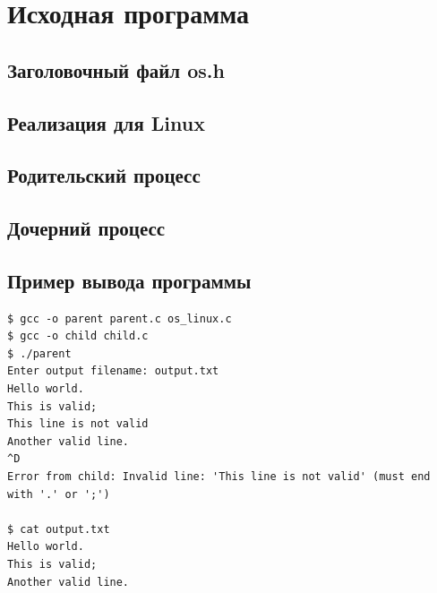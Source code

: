 \section{Исходная программа}

\subsection{Заголовочный файл os.h}
\begin{center}

\end{center}

\subsection{Реализация для Linux}
\begin{center}

\end{center}

\subsection{Родительский процесс}
\begin{center}

\end{center}

\subsection{Дочерний процесс}
\begin{center}

\end{center}

\subsection{Пример вывода программы}
\begin{verbatim}
$ gcc -o parent parent.c os_linux.c
$ gcc -o child child.c
$ ./parent
Enter output filename: output.txt
Hello world.
This is valid;
This line is not valid
Another valid line.
^D
Error from child: Invalid line: 'This line is not valid' (must end with '.' or ';')

$ cat output.txt
Hello world.
This is valid;
Another valid line.
\end{verbatim}


